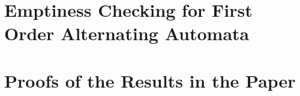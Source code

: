 \section{Emptiness Checking for First Order Alternating Automata}
\label{app:algorithm}



\section{Proofs of the Results in the Paper}
\label{app:proofs}
